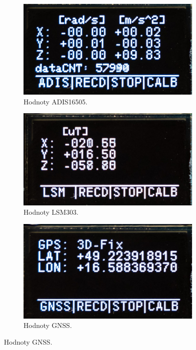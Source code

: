 \begin{itemize}
\begin{figure}[h]
\begin{subfigure}[b]{0.29\textwidth}
     \end{subfigure}
     \hfill
     \centering
     \begin{subfigure}[b]{0.29\textwidth}
         \centering
         \includegraphics[width=\textwidth]{obrazky/menuADIS}
         \caption{Hodnoty ADIS16505.}
       
     \end{subfigure}
     \centering
     \begin{subfigure}[b]{0.29\textwidth}
         \centering
         \includegraphics[width=\textwidth]{obrazky/menuLSM}
         \caption{Hodnoty LSM303.}
       
     \end{subfigure}
		\hfill
     \begin{subfigure}[b]{0.29\textwidth}
         \centering
         \includegraphics[width=\textwidth]{obrazky/menuGPS}
         \caption{Hodnoty GNSS.}
         

\end{subfigure}
\end{figure}
\end{itemize}
